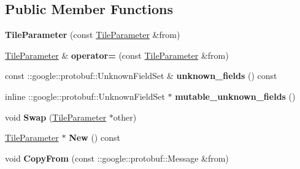 \subsection*{Public Member Functions}
\begin{DoxyCompactItemize}
\item 
\mbox{\label{classcaffe_1_1_tile_parameter_a1f66425c93d43285640047e9f03af2fb}} 
{\bfseries Tile\+Parameter} (const \mbox{\hyperlink{classcaffe_1_1_tile_parameter}{Tile\+Parameter}} \&from)
\item 
\mbox{\label{classcaffe_1_1_tile_parameter_a8bcfb84992402cdf1a9abd2addfb4fd5}} 
\mbox{\hyperlink{classcaffe_1_1_tile_parameter}{Tile\+Parameter}} \& {\bfseries operator=} (const \mbox{\hyperlink{classcaffe_1_1_tile_parameter}{Tile\+Parameter}} \&from)
\item 
\mbox{\label{classcaffe_1_1_tile_parameter_a7214ceb45faafdc8e113625dbcf36ddc}} 
const \+::google\+::protobuf\+::\+Unknown\+Field\+Set \& {\bfseries unknown\+\_\+fields} () const
\item 
\mbox{\label{classcaffe_1_1_tile_parameter_a5a0131d0c7f0a7c11b10a6f3734d963c}} 
inline \+::google\+::protobuf\+::\+Unknown\+Field\+Set $\ast$ {\bfseries mutable\+\_\+unknown\+\_\+fields} ()
\item 
\mbox{\label{classcaffe_1_1_tile_parameter_a163d1acbf76761bce7fede52faa67b02}} 
void {\bfseries Swap} (\mbox{\hyperlink{classcaffe_1_1_tile_parameter}{Tile\+Parameter}} $\ast$other)
\item 
\mbox{\label{classcaffe_1_1_tile_parameter_a4965acaa5647b57eb75251b89e953f93}} 
\mbox{\hyperlink{classcaffe_1_1_tile_parameter}{Tile\+Parameter}} $\ast$ {\bfseries New} () const
\item 
\mbox{\label{classcaffe_1_1_tile_parameter_a53205984a7ea267e53589d2fb0fe0abf}} 
void {\bfseries Copy\+From} (const \+::google\+::protobuf\+::\+Message \&from)
\item 
\mbox{\label{classcaffe_1_1_tile_parameter_a7b88bddc4dda1ec81cb6d865f6fc848a}} 

\end{DoxyCompactItemize}
